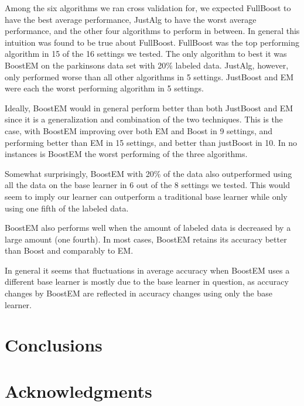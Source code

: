 \documentclass{sig-alternate}
\begin{document}
 Among the six algorithms we ran cross validation for, we expected FullBoost to have the best average performance, JustAlg to
have the worst average performance, and the other four algorithms to perform in between. In general this intuition was found to be true about FullBoost.
FullBoost was the top performing algorithm in 15 of the 16 settings we tested.
The only algorithm to best it was BoostEM on the parkinsons data set
with 20\% labeled data. JustAlg, however, only performed worse than all other algorithms in 5 settings. JustBoost and EM were each the worst performing algorithm
in 5 settings.

Ideally, BoostEM would in general perform better than both JustBoost and EM since it is a generalization and combination of the two techniques. This is the case, 
with BoostEM improving over both EM and Boost in 9 settings, and performing better than EM in 15 settings, and better than justBoost in 10. In no instances is BoostEM 
the worst performing of the three algorithms.

Somewhat surprisingly, BoostEM with 20\% of the data also outperformed using all the data on the base learner in 6 out of the 8 settings we tested.  This would seem to imply our learner can outperform a traditional base learner while only using one fifth of the labeled data.

BoostEM also performs well when the amount of labeled data is decreased by a large amount (one fourth).  In most cases, BoostEM retains its accuracy better than Boost and comparably to EM.

In general it seems that fluctuations in average accuracy when BoostEM uses a different base learner is mostly due to the base learner in question, as accuracy changes by BoostEM are reflected in accuracy changes using only the base learner.


\section{Conclusions}
\section{Acknowledgments}


\end{document}
